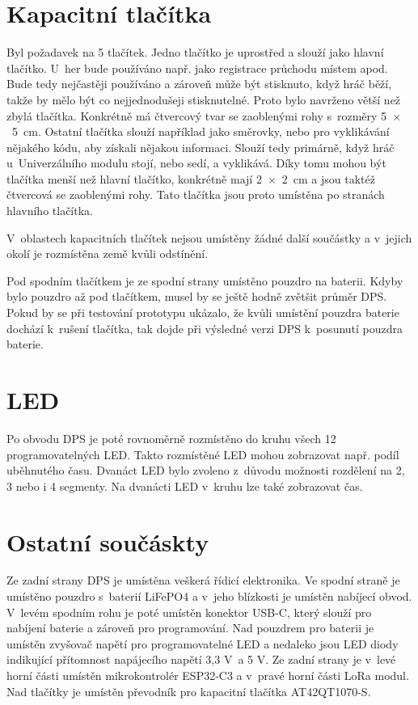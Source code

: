\section{Kapacitní tlačítka} 
Byl požadavek na 5 tlačítek. Jedno tlačítko je uprostřed a slouží jako hlavní tlačítko. U~her bude používáno např. jako registrace průchodu místem apod. Bude tedy nejčastěji
používáno a zároveň může být stisknuto, když hráč běží, takže by mělo být co nejjednodušeji stisknutelné. Proto bylo navrženo větší než zbylá tlačítka. Konkrétně má 
čtvercový tvar se zaoblenými rohy s~rozměry 5~$\times$~5~cm. Ostatní tlačítka slouží například jako směrovky, nebo pro vyklikávání nějakého kódu, aby získali nějakou informaci. 
Slouží tedy primárně, když hráč u~Univerzálního modulu stojí, nebo sedí, a vyklikává. Díky tomu mohou být tlačítka menší než hlavní tlačítko, konkrétně mají 2~$\times$~2~cm 
a jsou taktéž čtvercová se zaoblenými rohy. Tato tlačítka jsou proto umístěna po stranách hlavního tlačítka.

V~oblastech kapacitních tlačítek nejsou umístěny žádné další součástky a v~jejich okolí je rozmístěna země kvůli odstínění. 

Pod spodním tlačítkem je ze spodní strany umístěno pouzdro na baterii. Kdyby bylo pouzdro až pod tlačítkem, musel by se ještě hodně zvětšit průměr DPS. Pokud by se při testování 
prototypu ukázalo, že kvůli umístění pouzdra baterie dochází k~rušení tlačítka, tak dojde při výsledné verzi DPS k~posunutí pouzdra baterie. 

\section{LED}
Po obvodu DPS je poté rovnoměrně rozmístěno do kruhu všech 12 programovatelných LED. Takto rozmístěné LED mohou zobrazovat např. podíl uběhnutého času. Dvanáct LED bylo zvoleno 
z~důvodu možnosti rozdělení na 2, 3 nebo i 4 segmenty. Na dvanácti LED v~kruhu lze také zobrazovat čas.

\section{Ostatní součáskty}
Ze zadní strany DPS je umístěna veškerá řídicí elektronika. Ve spodní straně je umístěno pouzdro s~baterií LiFePO4 a v~jeho blízkosti je umístěn nabíjecí obvod. V~levém 
spodním rohu je poté umístěn konektor USB-C, který slouží pro nabíjení baterie a zároveň pro programování. Nad pouzdrem pro baterii je umístěn zvyšovač napětí pro programovatelné 
LED a nedaleko jsou LED diody indikující přítomnost napájecího napětí 3,3 V~a 5 V. Ze zadní strany je v~levé horní části umístěn mikrokontrolér ESP32-C3 a v~pravé horní části 
LoRa modul. Nad tlačítky je umístěn převodník pro kapacitní tlačítka AT42QT1070-S.

